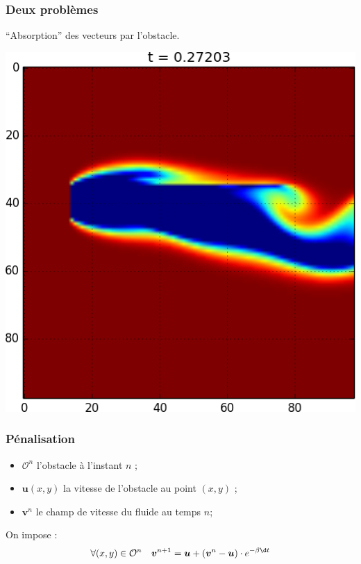 \documentclass{beamer}
\renewcommand\O{\mathcal{O}}
\newcommand{\vect}[1]{\boldsymbol{#1}}
\begin{document}
  \begin{frame}
    \frametitle{Deux problèmes}
    ``Absorption'' des vecteurs par l'obstacle.

    \centering \includegraphics[height=0.7\textheight]{absorption.png}
  \end{frame}

  \begin{frame}
    \frametitle{Pénalisation}
    \begin{itemize}
    \item $\O^n$ l'obstacle à l'instant $n$ ;
    \item $\vect{u}(x,y)$ la vitesse de l'obstacle au point $(x,y)$ ;
    \item $\vect{v}^n$ le champ de vitesse du fluide au temps $n$;
    \end{itemize}
    On impose :
    \[ \forall (x,y) \in \O^n\quad \vect{v}^{n+1} =
    \vect{u} + (\vect{v}^n - \vect{u})\cdot e^{-\beta \d  t} \]
  \end{frame}
\end{document}
